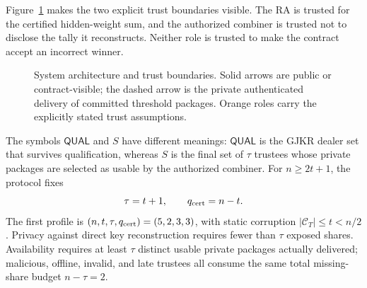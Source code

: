 \documentclass[pdflatex,sn-mathphys-num]{sn-jnl}%
\theoremstyle{thmstyleone}%
\theoremstyle{thmstyletwo}%
\theoremstyle{thmstylethree}%
\begin{document}
Figure~\ref{fig:architecture} makes the two explicit trust boundaries visible.
The RA is trusted for the certified hidden-weight sum, and the authorized
combiner is trusted not to disclose the tally it reconstructs.  Neither role
is trusted to make the contract accept an incorrect winner.

\begin{figure}[htbp]
\centering
{}
\caption{System architecture and trust boundaries.  Solid arrows are public
or contract-visible; the dashed arrow is the private authenticated delivery
of committed threshold packages.  Orange roles carry the explicitly stated
trust assumptions.}
\label{fig:architecture}
\end{figure}

The symbols $\mathsf{QUAL}$ and $S$ have different meanings:
$\mathsf{QUAL}$ is the GJKR dealer set that survives qualification, whereas
$S$ is the final set of $\tau$ trustees whose private packages are selected as
usable by the authorized combiner.  For $n\geq2t+1$, the protocol fixes
\[
 \tau=t+1,\qquad q_{\rm cert}=n-t.
\]
The first profile is $(n,t,\tau,q_{\rm cert})=(5,2,3,3)$,
with static corruption $|\mathcal C_T|\leq t<n/2$.  Privacy against direct
key reconstruction requires fewer than $\tau$ exposed shares.  Availability
requires at least $\tau$ distinct usable private packages actually delivered; malicious,
offline, invalid, and late trustees all consume the same total missing-share
budget $n-\tau=2$.
\end{document}
